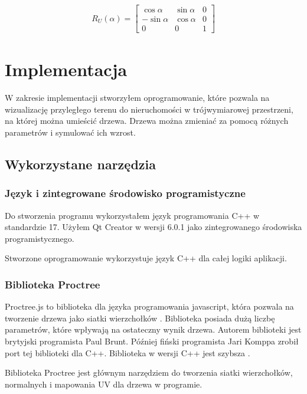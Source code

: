 \documentclass[a4paper,twoside,12pt]{report}
\begin{document}
\begin{gather}
	R_{U}(\alpha) =  
	\begin{bmatrix}
		\cos{\alpha} & \sin{\alpha} & 0   \\
		-\sin{\alpha} & \cos{\alpha} &  0 \\
		0 & 0 & 1
	\end{bmatrix}
\end{gather}



\chapter{Implementacja} 

W zakresie implementacji stworzyłem oprogramowanie, które pozwala na 
wizualizację przyległego terenu do nieruchomości w trójwymiarowej 
przestrzeni, na której można umieścić drzewa. Drzewa można 
zmieniać za pomocą różnych parametrów i symulować ich wzrost.

\section{Wykorzystane narzędzia}

\subsection{Język i zintegrowane środowisko programistyczne}

Do stworzenia programu wykorzystałem język programowania 
C++ w standardzie 17. Użyłem Qt Creator w wersji 6.0.1 jako 
zintegrowanego środowiska programistycznego.

Stworzone oprogramowanie wykorzystuje język C++ dla całej logiki aplikacji.

\subsection{Biblioteka Proctree}

Proctree.js to biblioteka dla języka programowania javascript, 
która pozwala na tworzenie drzewa jako siatki wierzchołków \cite{proctreejs}.
Biblioteka posiada dużą liczbę parametrów, które wpływają na 
ostateczny wynik drzewa. Autorem biblioteki jest brytyjski 
programista Paul Brunt. Później fiński programista Jari Komppa 
zrobił port tej biblioteki dla C++. Biblioteka w wersji C++ jest szybsza \cite{proctree}.

Biblioteka Proctree jest głównym narzędziem do tworzenia siatki wierzchołków,
normalnych i mapowania UV dla drzewa w programie.
\end{document}
